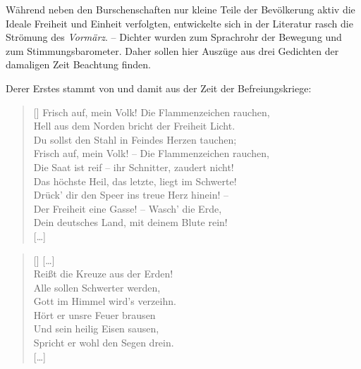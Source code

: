 Während neben den Burschenschaften nur kleine Teile der Bevölkerung
aktiv die Ideale Freiheit und Einheit verfolgten, entwickelte sich in
der Literatur rasch die Strömung des \emph{Vormärz}. -- Dichter wurden
zum Sprachrohr der Bewegung und zum Stimmungsbarometer. Daher sollen
hier Auszüge aus drei Gedichten der damaligen Zeit Beachtung finden.

Derer Erstes stammt von  und
damit aus der Zeit der Befreiungskriege:

\settowidth{\versewidth}{Frisch auf, mein Volk! – Die Flammenzeichen rauchen,}

\begin{verse}[\versewidth]
Frisch auf, mein Volk! Die Flammenzeichen rauchen, \\
Hell aus dem Norden bricht der Freiheit Licht. \\
Du sollst den Stahl in Feindes Herzen tauchen; \\
Frisch auf, mein Volk! – Die Flammenzeichen rauchen, \\
Die Saat ist reif – ihr Schnitter, zaudert nicht! \\
Das höchste Heil, das letzte, liegt im Schwerte! \\
Drück' dir den Speer ins treue Herz hinein! – \\
Der Freiheit eine Gasse! – Wasch' die Erde, \\
Dein deutsches Land, mit deinem Blute rein! \\
\mbox{[\dots]}
\end{verse}


\settowidth{\versewidth}{Spricht er wohl den Segen drein.}

\begin{verse}[\versewidth]
\mbox{[\dots]} \\
Reißt die Kreuze aus der Erden! \\
Alle sollen Schwerter werden, \\
Gott im Himmel wird's verzeihn. \\
Hört er unsre Feuer brausen \\
Und sein heilig Eisen sausen, \\
Spricht er wohl den Segen drein. \\
\mbox{[\dots]}
\end{verse}

